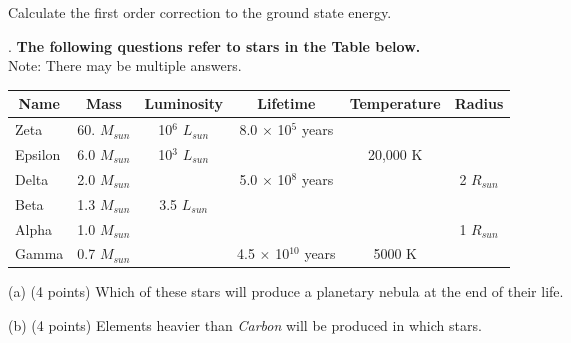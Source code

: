 \documentclass[12pt]{article}
\begin{document}
\hspace*{7mm} Calculate the first order correction to the ground state energy.
\vskip0.5in

. {\bf The following questions refer to stars in the Table below.}\\
\noindent \hspace*{3mm}  Note: There may be multiple answers. 

\vskip0.15in

\noindent \hspace*{3mm} \begin{tabular}{lccccr}\hline
\multicolumn{1}{|c|}{Name} & \multicolumn{1}{c|}{Mass} & \multicolumn{1}{c|}{Luminosity} & \multicolumn{1}{c|}{Lifetime} & \multicolumn{1}{c|}{Temperature} & \multicolumn{1}{c|}{Radius} \\\hline
\multicolumn{1}{|l|}{Zeta}   & \multicolumn{1}{c|}{60. $M_{sun}$}   &  \multicolumn{1}{c|}{10$^{6}$ $L_{sun}$}  & \multicolumn{1}{c|}{8.0 $\times$ 10$^{5}$ years} & \multicolumn{1}{c|}{  } & \multicolumn{1}{c|}{  } \\\hline
\multicolumn{1}{|l|}{Epsilon }  & \multicolumn{1}{c|}{6.0 $M_{sun}$}  &   \multicolumn{1}{c|}{10$^{3}$ $L_{sun}$}  &\multicolumn{1}{c|}{  } & \multicolumn{1}{c|}{20,000 K} &\multicolumn{1}{c|}{ }  \\\hline
\multicolumn{1}{|l|}{Delta}   & \multicolumn{1}{c|}{2.0 $M_{sun}$}   & \multicolumn{1}{c|}{ } &   \multicolumn{1}{c|}{5.0 $\times$ 10$^{8}$ years} & \multicolumn{1}{c|}{ } & \multicolumn{1}{c|}{2 $R_{sun}$} \\\hline
\multicolumn{1}{|l|}{Beta} & \multicolumn{1}{c|}{1.3 $M_{sun}$} & \multicolumn{1}{c|}{3.5 $L_{sun}$}  &\multicolumn{1}{c|}{ } &\multicolumn{1}{c|}{ } &\multicolumn{1}{c|}{ } \\\hline
\multicolumn{1}{|l|}{Alpha} & \multicolumn{1}{c|}{1.0 $M_{sun}$} & \multicolumn{1}{c|}{ } & \multicolumn{1}{c|}{ } & \multicolumn{1}{c|}{ } & \multicolumn{1}{c|}{1 $R_{sun}$}  \\\hline
\multicolumn{1}{|l|}{Gamma} & \multicolumn{1}{c|}{0.7 $M_{sun}$} & \multicolumn{1}{c|}{ } & \multicolumn{1}{c|}{4.5 $\times$ 10$^{10}$ years} & \multicolumn{1}{c|}{5000 K} & \multicolumn{1}{c|}{ }\\\hline
\end{tabular}\vskip 0.2in
\vskip0.1in
(a) \hspace*{1mm} (4 points) Which of these stars will produce a planetary nebula at the end of their life.

\vskip 0.5in
(b) \hspace*{1mm} (4 points) Elements heavier than \textit{Carbon} will be produced in which stars.
\end{document}
